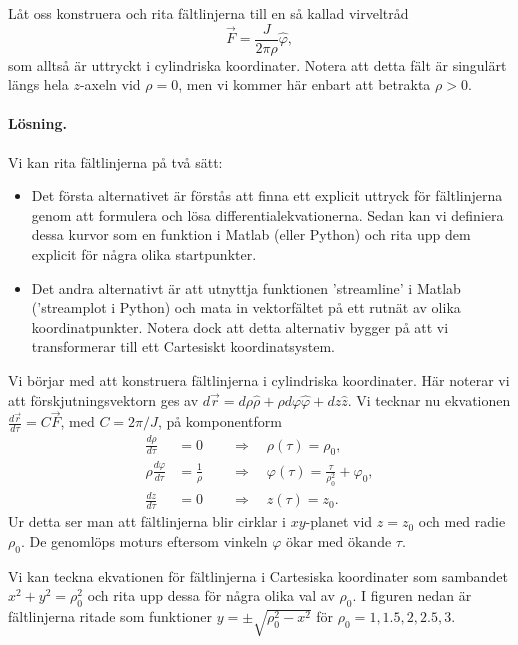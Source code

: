 \documentclass[%
oneside,                 %
final,                   %
10pt]{article}
\newenvironment{notice_mdfboxadmon}[1][]{
\begin{notice_mdfboxmdframed}[frametitle=#1]
}
{
\end{notice_mdfboxmdframed}
}
\begin{document}
\begin{notice_mdfboxadmon}
Låt oss konstruera och rita fältlinjerna till en så kallad virveltråd
\begin{equation}
\vec F = \frac{J}{2\pi\rho} \hat{\varphi}, 
\end{equation}
som alltså är uttryckt i cylindriska koordinater. Notera att detta fält är singulärt längs hela $z$-axeln vid $\rho=0$, men vi kommer här enbart att betrakta $\rho > 0$.

\paragraph{Lösning.}
Vi kan rita fältlinjerna på två sätt:
\begin{itemize}
\item Det första alternativet är förstås att finna ett explicit uttryck för fältlinjerna genom att formulera och lösa differentialekvationerna. Sedan kan vi definiera dessa kurvor som en funktion i Matlab (eller Python) och rita upp dem explicit för några olika startpunkter.

\item Det andra alternativt är att utnyttja funktionen 'streamline' i Matlab ('streamplot i Python) och mata in vektorfältet på ett rutnät av olika koordinatpunkter. Notera dock att detta alternativ bygger på att vi transformerar till ett Cartesiskt koordinatsystem.
\end{itemize}

\noindent
Vi börjar med att konstruera fältlinjerna i cylindriska koordinater. Här noterar vi att förskjutningsvektorn ges av $d\vec{r} = d\rho \hat\rho + \rho d\varphi\hat\varphi + dz\hat z$. Vi tecknar nu ekvationen $\frac{d\vec{r}}{d \tau} = C \vec{F}$, med $C=2\pi/J$, på komponentform
\begin{align*}
\frac{d\rho}{d\tau} &= 0 \qquad \Rightarrow \quad \rho(\tau) = \rho_0, \\ 
\rho \frac{d\varphi}{d\tau} &= \frac{1}{\rho} \qquad \Rightarrow \quad \varphi(\tau) = \frac{\tau}{\rho_0^2} + \varphi_0, \\ 
\frac{d z}{d\tau} &= 0 \qquad \Rightarrow \quad z(\tau) = z_0.
\end{align*}
Ur detta ser man att fältlinjerna blir cirklar i $xy$-planet vid $z=z_0$ och med radie $\rho_0$. De genomlöps moturs eftersom vinkeln $\varphi$ ökar med ökande $\tau$.

Vi kan teckna ekvationen för fältlinjerna i Cartesiska koordinater som sambandet $x^2+y^2 = \rho_0^2$ och rita upp dessa för några olika val av $\rho_0$. I figuren nedan är fältlinjerna ritade som funktioner $y = \pm \sqrt{\rho_0^2 - x^2}$ för $\rho_0 = 1,1.5,2,2.5,3$.




\end{notice_mdfboxadmon}
\end{document}
